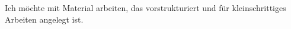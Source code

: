 Ich möchte mit Material arbeiten, das vorstrukturiert und für kleinschrittiges Arbeiten angelegt ist.